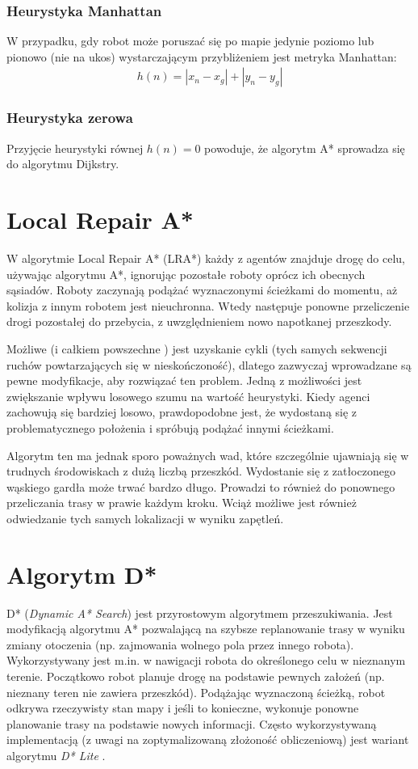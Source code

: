 \subsubsection{Heurystyka Manhattan}
W przypadku, gdy robot może poruszać się po mapie jedynie poziomo lub pionowo (nie na ukos) wystarczającym przybliżeniem jest metryka Manhattan:
\begin{gather}
 	h(n) = |x_n - x_g| + |y_n - y_g|
 	\label{eq_astar_heu_man} 
\end{gather}

\subsubsection{Heurystyka zerowa}
Przyjęcie heurystyki równej $h(n) = 0$ powoduje, że algorytm A* sprowadza się do algorytmu Dijkstry.

\section{Local Repair A*}
W algorytmie Local Repair A* (LRA*) każdy z agentów znajduje drogę do celu, używając algorytmu A*, ignorując pozostałe roboty oprócz ich obecnych sąsiadów. Roboty zaczynają podążać wyznaczonymi ścieżkami do momentu, aż kolizja z innym robotem jest nieuchronna. Wtedy następuje ponowne przeliczenie drogi pozostałej do przebycia, z uwzględnieniem nowo napotkanej przeszkody.

Możliwe (i całkiem powszechne \cite{cooppath}) jest uzyskanie cykli (tych samych sekwencji ruchów powtarzających się w nieskończoność), dlatego zazwyczaj wprowadzane są pewne modyfikacje, aby rozwiązać ten problem. Jedną z możliwości jest zwiększanie wpływu losowego szumu na wartość heurystyki. Kiedy agenci zachowują się bardziej losowo, prawdopodobne jest, że wydostaną się z problematycznego położenia i spróbują podążać innymi ścieżkami.

Algorytm ten ma jednak sporo poważnych wad, które szczególnie ujawniają się w trudnych środowiskach z dużą liczbą przeszkód. Wydostanie się z zatłoczonego wąskiego gardła może trwać bardzo długo. Prowadzi to również do ponownego przeliczania trasy w prawie każdym kroku. Wciąż możliwe jest również odwiedzanie tych samych lokalizacji w wyniku zapętleń.

\section{Algorytm D*}
D* ({\it Dynamic A* Search}) jest przyrostowym algorytmem przeszukiwania. Jest modyfikacją algorytmu A* pozwalającą na szybsze replanowanie trasy w wyniku zmiany otoczenia (np. zajmowania wolnego pola przez innego robota). Wykorzystywany jest m.in. w nawigacji robota do określonego celu w nieznanym terenie. Początkowo robot planuje drogę na podstawie pewnych założeń (np. nieznany teren nie zawiera przeszkód). Podążając wyznaczoną ścieżką, robot odkrywa rzeczywisty stan mapy i jeśli to konieczne, wykonuje ponowne planowanie trasy na podstawie nowych informacji.
Często wykorzystywaną implementacją (z uwagi na zoptymalizowaną złożoność obliczeniową) jest wariant algorytmu {\it D* Lite} \cite{dstarlite}.

